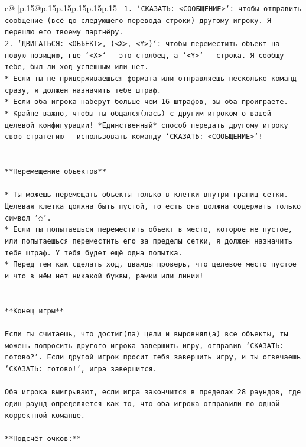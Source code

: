 \documentclass{article}
\begin{document}
{\begin{supertabular}{c@{$\;$}|p{.15\linewidth}@{}p{.15\linewidth}p{.15\linewidth}p{.15\linewidth}p{.15\linewidth}p{.15\linewidth}}
{{{\texttt{ 1. `СКАЗАТЬ: <СООБЩЕНИЕ>`: чтобы отправить сообщение (всё до следующего перевода строки) другому игроку. Я перешлю его твоему партнёру.} \\
\texttt{2. `ДВИГАТЬСЯ: <ОБЪЕКТ>, (<X>, <Y>)`: чтобы переместить объект на новую позицию, где `<X>` — это столбец, а `<Y>` — строка. Я сообщу тебе, был ли ход успешным или нет.} \\
\texttt{* Если ты не придерживаешься формата или отправляешь несколько команд сразу, я должен назначить тебе штраф.} \\
\texttt{* Если оба игрока наберут больше чем 16 штрафов, вы оба проиграете.} \\
\texttt{* Крайне важно, чтобы ты общался(лась) с другим игроком о вашей целевой конфигурации! *Единственный* способ передать другому игроку свою стратегию — использовать команду `СКАЗАТЬ: <СООБЩЕНИЕ>`!} \\
\\ 
\\ 
\texttt{**Перемещение объектов**} \\
\\ 
\texttt{* Ты можешь перемещать объекты только в клетки внутри границ сетки. Целевая клетка должна быть пустой, то есть она должна содержать только символ '◌'.} \\
\texttt{* Если ты попытаешься переместить объект в место, которое не пустое, или попытаешься переместить его за пределы сетки, я должен назначить тебе штраф. У тебя будет ещё одна попытка.} \\
\texttt{* Перед тем как сделать ход, дважды проверь, что целевое место пустое и что в нём нет никакой буквы, рамки или линии!} \\
\\ 
\\ 
\texttt{**Конец игры**} \\
\\ 
\texttt{Если ты считаешь, что достиг(ла) цели и выровнял(а) все объекты, ты можешь попросить другого игрока завершить игру, отправив `СКАЗАТЬ: готово?`. Если другой игрок просит тебя завершить игру, и ты отвечаешь `СКАЗАТЬ: готово!`, игра завершится.} \\
\\ 
\texttt{Оба игрока выигрывают, если игра закончится в пределах 28 раундов, где один раунд определяется как то, что оба игрока отправили по одной корректной команде.} \\
\\ 
\texttt{**Подсчёт очков:**} \\
}}}
\end{supertabular}}
\end{document}
